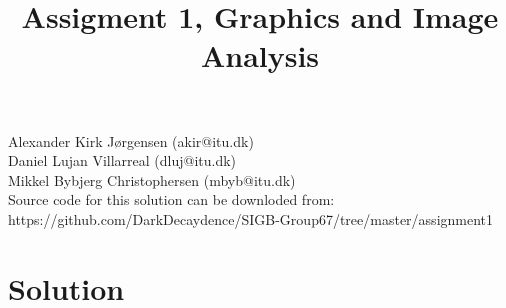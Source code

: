 \documentclass{article}
\title{Assigment 1, Graphics and Image Analysis}
\begin{document}
	\maketitle
	\begin{center}
	Alexander Kirk Jørgensen (akir@itu.dk)\\
	Daniel Lujan Villarreal (dluj@itu.dk)\\
	Mikkel Bybjerg Christophersen (mbyb@itu.dk)\\[6mm]
	Source code for this solution can be downloded from:\\
	\mbox{https://github.com/DarkDecaydence/SIGB-Group67/tree/master/assignment1}
	\newpage
	\tableofcontents
	\newpage
	\end{center}
	
	
	\section{Solution}
	
	
	
	
	
\end{document}
